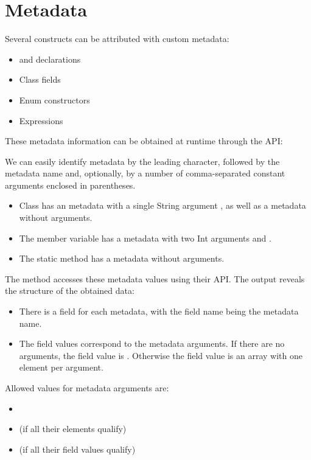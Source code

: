 \section{Metadata}
\label{lf-metadata}

Several constructs can be attributed with custom metadata:

\begin{itemize}
	\item {} and  declarations
	\item Class fields
	\item Enum constructors
	\item Expressions
\end{itemize}

These metadata information can be obtained at runtime through the  API:


We can easily identify metadata by the leading  character, followed by the metadata name and, optionally, by a number of comma-separated constant arguments enclosed in parentheses.

\begin{itemize}
	\item Class  has an  metadata with a single String argument , as well as a  metadata without arguments.
	\item The member variable  has a  metadata with two Int arguments  and .
	\item The static method  has a  metadata without arguments.
\end{itemize}

The  method accesses these metadata values using their API. The output reveals the structure of the obtained data:

\begin{itemize}
	\item There is a field for each metadata, with the field name being the metadata name.
	\item The field values correspond to the metadata arguments. If there are no arguments, the field value is . Otherwise the field value is an array with one element per argument.
\end{itemize}

Allowed values for metadata arguments are:

\begin{itemize}
	\item {}
	\item {} (if all their elements qualify)
	\item {} (if all their field values qualify)
\end{itemize}

